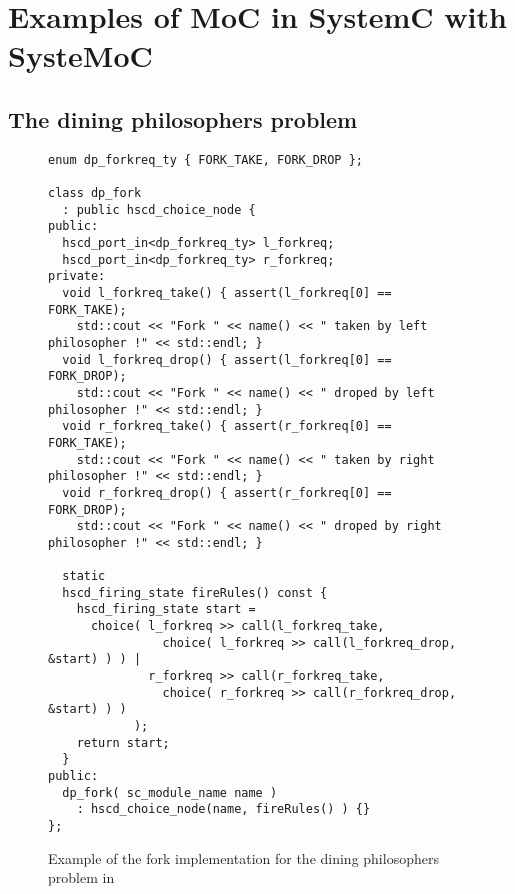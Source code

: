 
\section{Examples of MoC in SystemC with SysteMoC}\label{systemoc-examples}

\subsection{The dining philosophers problem}

\begin{figure}
\centering
\begin{verbatim}
enum dp_forkreq_ty { FORK_TAKE, FORK_DROP };

class dp_fork
  : public hscd_choice_node {
public:
  hscd_port_in<dp_forkreq_ty> l_forkreq;
  hscd_port_in<dp_forkreq_ty> r_forkreq;
private:
  void l_forkreq_take() { assert(l_forkreq[0] == FORK_TAKE);
    std::cout << "Fork " << name() << " taken by left philosopher !" << std::endl; }
  void l_forkreq_drop() { assert(l_forkreq[0] == FORK_DROP);
    std::cout << "Fork " << name() << " droped by left philosopher !" << std::endl; }
  void r_forkreq_take() { assert(r_forkreq[0] == FORK_TAKE);
    std::cout << "Fork " << name() << " taken by right philosopher !" << std::endl; }
  void r_forkreq_drop() { assert(r_forkreq[0] == FORK_DROP);
    std::cout << "Fork " << name() << " droped by right philosopher !" << std::endl; }
  
  static
  hscd_firing_state fireRules() const {
    hscd_firing_state start =
      choice( l_forkreq >> call(l_forkreq_take,
                choice( l_forkreq >> call(l_forkreq_drop, &start) ) ) |
              r_forkreq >> call(r_forkreq_take,
                choice( r_forkreq >> call(r_forkreq_drop, &start) ) )
            );
    return start;
  }
public:
  dp_fork( sc_module_name name )
    : hscd_choice_node(name, fireRules() ) {}
};
\end{verbatim}
\caption{\label{dining-philosophers-fork-systemoc}
  Example of the fork implementation for the
  dining philosophers problem in \SysteMoC{}}
\end{figure}


